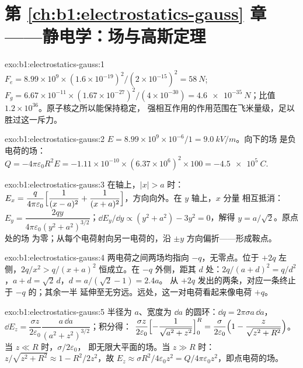 \section*{第 \ref{ch:b1:electrostatics-gauss} 章——静电学：场与高斯定理}

\begin{solution}{exo:b1:electrostatics-gauss:1}
$F_e = 8.99 \times 10^9 \times (1.6 \times 10^{-19})^2/(2 \times 10^{-15})^2 = \qty{58}{N}$;
$F_g = 6.67 \times 10^{-11} \times (1.67 \times 10^{-27})^2/(4 \times 10^{-30}) =
\qty{4.6e-35}{N}$；比值 $1.2 \times 10^{36}$。原子核之所以能保持稳定，
强相互作用的作用范围在飞米量级，足以胜过这一斥力。
\end{solution}

\begin{solution}{exo:b1:electrostatics-gauss:2}
$E = 8.99 \times 10^9 \times 10^{-6}/1 = \qty{9.0}{kV/m}$。向下的场
是负电荷的场：$Q = -4\pi\varepsilon_0R^2E = -1.11 \times 10^{-10} \times
(6.37 \times 10^6)^2 \times 100 = \qty{-4.5e5}{C}$.
\end{solution}

\begin{solution}{exo:b1:electrostatics-gauss:3}
在轴上，$|x| > a$ 时：$E_x = \dfrac{q}{4\pi\varepsilon_0}\Bigl[\dfrac{1}{(x - a)^2} +
\dfrac{1}{(x + a)^2}\Bigr]$，方向向外。在 $y$ 轴上，$x$ 分量
相互抵消：$E_y = \dfrac{2qy}{4\pi\varepsilon_0(y^2 + a^2)^{3/2}}$；$\dd E_y/\dd y \propto
(y^2 + a^2) - 3y^2 = 0$，解得 $y = a/\sqrt2$。原点处的场
为零；从每个电荷射向另一电荷的，沿
$\pm y$ 方向偏折——形成鞍点。
\end{solution}

\begin{solution}{exo:b1:electrostatics-gauss:4}
两电荷之间两场均指向 $-q$，无零点。位于
$+2q$ 左侧，$2q/x^2 > q/(x + a)^2$ 恒成立。在 $-q$ 外侧，距其 $d$
处：$2q/(a + d)^2 = q/d^2$，$a + d = \sqrt2\,d$，$d = a/(\sqrt2 - 1) = 2.4a$。
从 $+2q$ 发出的两条，对应一条终止于 $-q$ 的；其余一半
延伸至无穷远。远处，这一对电荷看起来像电荷 $+q$。
\end{solution}

\begin{solution}{exo:b1:electrostatics-gauss:5}
半径为 $a$、宽度为 $\dd a$ 的圆环：$\dd q = 2\pi\sigma a\,\dd a$，$\dd E_z =
\dfrac{\sigma z}{2\varepsilon_0}\dfrac{a\,\dd a}{(a^2 + z^2)^{3/2}}$；积分得：
$\dfrac{\sigma z}{2\varepsilon_0}\Bigl[-\dfrac{1}{\sqrt{a^2 + z^2}}\Bigr]_0^R = \dfrac{\sigma}{2\varepsilon_0}
\Bigl(1 - \dfrac{z}{\sqrt{z^2 + R^2}}\Bigr)$。当 $z \ll R$ 时，$\sigma/2\varepsilon_0$，
即无限大平面的场。当 $z \gg R$ 时：$z/\sqrt{z^2 + R^2} \approx 1 - R^2/2z^2$，故 $E_z
\approx \sigma R^2/4\varepsilon_0z^2 = Q/4\pi\varepsilon_0z^2$，即点电荷的场。
\end{solution}

